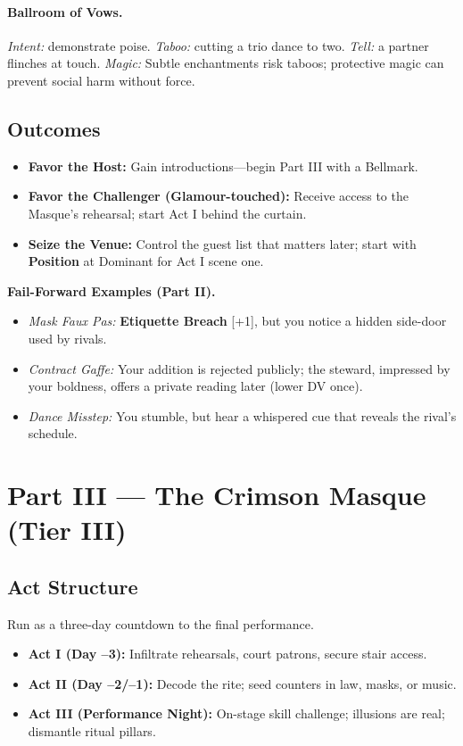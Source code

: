 \documentclass[11pt]{article}
\newcommand{\Clock}[2]{\textbf{#1} [#2]}
\newcommand{\Term}[1]{\textbf{#1}}
\newcommand{\Position}{\Term{Position}}
\begin{document}
\paragraph{Ballroom of Vows.} \emph{Intent:} demonstrate poise. \emph{Taboo:} cutting a trio dance to two. \emph{Tell:} a partner flinches at touch. \emph{Magic:} Subtle enchantments risk taboos; protective magic can prevent social harm without force.

\subsection*{Outcomes}
\begin{itemize}
\item \textbf{Favor the Host:} Gain introductions---begin Part III with a Bellmark.
\item \textbf{Favor the Challenger (Glamour-touched):} Receive access to the Masque's rehearsal; start Act I behind the curtain.
\item \textbf{Seize the Venue:} Control the guest list that matters later; start with \Position{} at Dominant for Act I scene one.
\end{itemize}

\begin{tcolorbox}[breakable]
\textbf{Fail-Forward Examples (Part II).}
\begin{itemize}
\item \emph{Mask Faux Pas:} \Clock{Etiquette Breach}{+1}, but you notice a hidden side-door used by rivals.
\item \emph{Contract Gaffe:} Your addition is rejected publicly; the steward, impressed by your boldness, offers a private reading later (lower DV once).
\item \emph{Dance Misstep:} You stumble, but hear a whispered cue that reveals the rival's schedule.
\end{itemize}
\end{tcolorbox}

\section*{Part III --- The Crimson Masque (Tier III)}

\subsection*{Act Structure}
Run as a three-day countdown to the final performance.
\begin{itemize}
\item \textbf{Act I (Day --3):} Infiltrate rehearsals, court patrons, secure stair access.
\item \textbf{Act II (Day --2/--1):} Decode the rite; seed counters in law, masks, or music.
\item \textbf{Act III (Performance Night):} On-stage skill challenge; illusions are real; dismantle ritual pillars.
\end{itemize}
\end{document}
